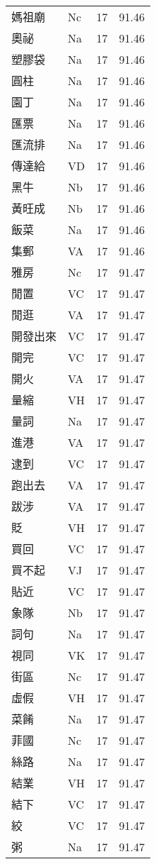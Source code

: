 \documentclass[twocolumn]{book}
\begin{document}
\begin{supertabular}{llrr}
媽祖廟 & Nc & 17 &  91.46\\
奧祕 & Na & 17 &  91.46\\
塑膠袋 & Na & 17 &  91.46\\
圓柱 & Na & 17 &  91.46\\
園丁 & Na & 17 &  91.46\\
匯票 & Na & 17 &  91.46\\
匯流排 & Na & 17 &  91.46\\
傳達給 & VD & 17 &  91.46\\
黑牛 & Nb & 17 &  91.46\\
黃旺成 & Nb & 17 &  91.46\\
飯菜 & Na & 17 &  91.46\\
集郵 & VA & 17 &  91.46\\
雅房 & Nc & 17 &  91.47\\
閒置 & VC & 17 &  91.47\\
閒逛 & VA & 17 &  91.47\\
開發出來 & VC & 17 &  91.47\\
開完 & VC & 17 &  91.47\\
開火 & VA & 17 &  91.47\\
量縮 & VH & 17 &  91.47\\
量詞 & Na & 17 &  91.47\\
進港 & VA & 17 &  91.47\\
逮到 & VC & 17 &  91.47\\
跑出去 & VA & 17 &  91.47\\
跋涉 & VA & 17 &  91.47\\
貶 & VH & 17 &  91.47\\
買回 & VC & 17 &  91.47\\
買不起 & VJ & 17 &  91.47\\
貼近 & VC & 17 &  91.47\\
象隊 & Nb & 17 &  91.47\\
詞句 & Na & 17 &  91.47\\
視同 & VK & 17 &  91.47\\
街區 & Nc & 17 &  91.47\\
虛假 & VH & 17 &  91.47\\
菜餚 & Na & 17 &  91.47\\
菲國 & Nc & 17 &  91.47\\
絲路 & Na & 17 &  91.47\\
結業 & VH & 17 &  91.47\\
結下 & VC & 17 &  91.47\\
絞 & VC & 17 &  91.47\\
粥 & Na & 17 &  91.47\\

\end{supertabular}
\end{document}
